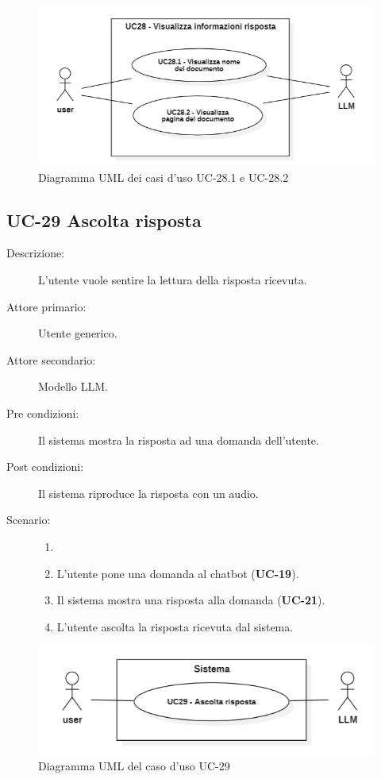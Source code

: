 \begin{figure}[H]
    \centering
    \includegraphics[width=0.9\linewidth]{UC28.1.PNG} 
    \caption{Diagramma UML dei casi d'uso UC-28.1 e UC-28.2}
\end{figure}

\subsection{UC-29 Ascolta risposta}
\begin{description}
    \item[Descrizione:] L'utente vuole sentire la lettura della risposta ricevuta.
    \item[Attore primario:] Utente generico.
    \item[Attore secondario:] Modello LLM.
    \item[Pre condizioni:] Il sistema mostra la risposta ad una domanda dell'utente.
    \item[Post condizioni:] Il sistema riproduce la risposta con un audio.
    \item[Scenario:]
    \begin{enumerate}
        \item[]
        \item L’utente pone una domanda al chatbot (\textbf{UC-19}).
        \item Il sistema mostra una risposta alla domanda (\textbf{UC-21}).
        \item L'utente ascolta la risposta ricevuta dal sistema.
    \end{enumerate}
\end{description}

\begin{figure}[H]
    \centering
    \includegraphics[width=0.9\linewidth]{UC29.png} 
    \caption{Diagramma UML del caso d'uso UC-29}
\end{figure}
